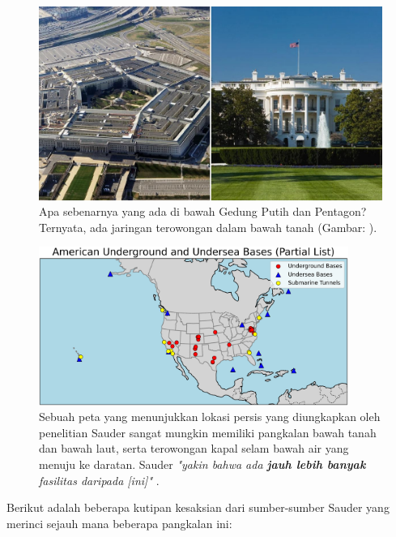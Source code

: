\documentclass[10pt,twocolumn,letterpaper]{article}
\begin{document}
\begin{figure}[b]
\begin{center}
   \includegraphics[width=1\linewidth]{penta.jpg}
\end{center}
   \caption{Apa sebenarnya yang ada di bawah Gedung Putih dan Pentagon? Ternyata, ada jaringan terowongan dalam bawah tanah (Gambar: \cite{31}).}
\label{fig:3}
\label{fig:onecol}
\end{figure}
\begin{figure}[t]
\begin{center}
\includegraphics[width=0.9\textwidth]{basescrop.png}
\end{center}
   \caption{Sebuah peta yang menunjukkan lokasi persis yang diungkapkan oleh penelitian Sauder sangat mungkin memiliki pangkalan bawah tanah dan bawah laut, serta terowongan kapal selam bawah air yang menuju ke daratan. Sauder \textit{"yakin bahwa ada \textbf{jauh lebih banyak} fasilitas daripada [ini]"} \cite{22}.}
   \label{fig:4}
\end{figure}

Berikut adalah beberapa kutipan kesaksian dari sumber-sumber Sauder yang merinci sejauh mana beberapa pangkalan ini:
\end{document}
